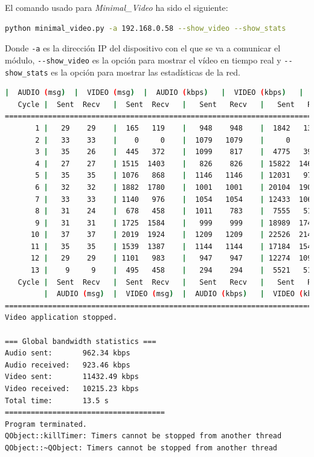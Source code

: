 El comando usado para \textit{Minimal\_Video} ha sido el siguiente:
\begin{lstlisting}[language=bash]
python minimal_video.py -a 192.168.0.58 --show_video --show_stats
\end{lstlisting}
Donde \verb|-a| es la dirección IP del dispositivo con el que se va a comunicar el módulo, \verb|--show_video| es la opción para mostrar el vídeo en tiempo real y \verb|--show_stats| es la opción para mostrar las estadísticas de la red.
\vspace{\baselineskip}

\begin{lstlisting}[language=bash,basicstyle=\ttfamily\tiny]
         |  AUDIO (msg)  |  VIDEO (msg)  |  AUDIO (kbps)   |  VIDEO (kbps)   |     CPU (%) 
   Cycle |  Sent  Recv   |  Sent  Recv   |   Sent   Recv   |   Sent   Recv   | Program System
================================================================================================
       1 |   29    29    |  165   119    |   948    948    |  1842   1330    |  21      0       
       2 |   33    33    |    0     0    |  1079   1079    |     0      0    |  38     76       
       3 |   35    26    |  445   372    |  1099    817    |  4775   3991    |  38     78       
       4 |   27    27    | 1515  1403    |   826    826    | 15822  14654    |  31     65       
       5 |   35    35    | 1076   868    |  1146   1146    | 12031   9705    |  40     70       
       6 |   32    32    | 1882  1780    |  1001   1001    | 20104  19018    |  40     71       
       7 |   33    33    | 1140   976    |  1054   1054    | 12433  10644    |  30     68       
       8 |   31    24    |  678   458    |  1011    783    |  7555   5105    |  43     70       
       9 |   31    31    | 1725  1584    |   999    999    | 18989  17437    |  28     67       
      10 |   37    37    | 2019  1924    |  1209   1209    | 22526  21467    |  46     74       
      11 |   35    35    | 1539  1387    |  1144   1144    | 17184  15485    |  45     70       
      12 |   29    29    | 1101   983    |   947    947    | 12274  10959    |  34     70       
      13 |    9     9    |  495   458    |   294    294    |  5521   5110    |   6     72       
   Cycle |  Sent  Recv   |  Sent  Recv   |   Sent   Recv   |   Sent   Recv   | Program System
         |  AUDIO (msg)  |  VIDEO (msg)  |  AUDIO (kbps)   |  VIDEO (kbps)   |     CPU (%) 
===========================================================================================
Video application stopped.

=== Global bandwidth statistics ===
Audio sent:       962.34 kbps
Audio received:   923.46 kbps
Video sent:       11432.49 kbps
Video received:   10215.23 kbps
Total time:       13.5 s
=====================================
Program terminated.
QObject::killTimer: Timers cannot be stopped from another thread
QObject::~QObject: Timers cannot be stopped from another thread
\end{lstlisting}
\vspace{\baselineskip}

